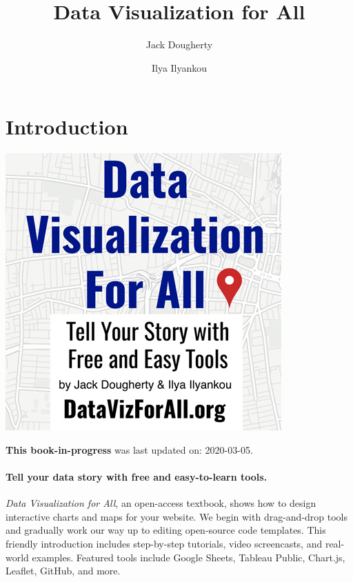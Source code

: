 \documentclass[
  english,
]{book}
\title{Data Visualization for All}
\author{Jack Dougherty \and Ilya Ilyankou}
\date{}
\begin{document}
\maketitle

{
\setcounter{tocdepth}{1}
\tableofcontents
}
\hypertarget{introduction}{%
\chapter*{Introduction}\label{introduction}}

\includegraphics{images/0-introduction/cover-400wide.jpg}

\textbf{This book-in-progress} was last updated on: 2020-03-05.

\hypertarget{tell-your-data-story-with-free-and-easy-to-learn-tools.}{%
\subsubsection*{Tell your data story with free and easy-to-learn tools.}\label{tell-your-data-story-with-free-and-easy-to-learn-tools.}}

\emph{Data Visualization for All}, an open-access textbook, shows how to design interactive charts and maps for your website. We begin with drag-and-drop tools and gradually work our way up to editing open-source code templates. This friendly introduction includes step-by-step tutorials, video screencasts, and real-world examples. Featured tools include Google Sheets, Tableau Public, Chart.js, Leaflet, GitHub, and more.
\end{document}
